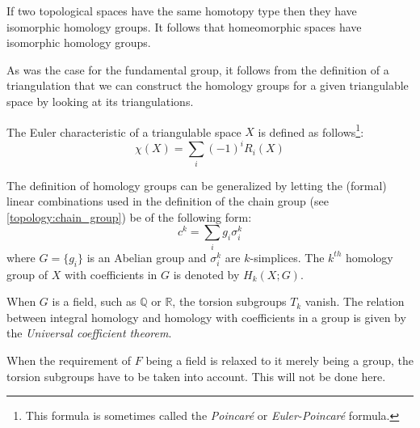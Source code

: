 	\begin{property}
		If two topological spaces have the same homotopy type then they have isomorphic homology groups. It follows that homeomorphic spaces have isomorphic homology groups.
	\end{property}
	\begin{result}
		As was the case for the fundamental group, it follows from the definition of a triangulation that we can construct the homology groups for a given triangulable space by looking at its triangulations.
	\end{result}
	
	\begin{formula}
		The Euler characteristic of a triangulable space $X$ is defined as follows\footnote{This formula is sometimes called the \textit{Poincar\'e} or \textit{Euler-Poincar\'e} formula.}:
		\begin{equation}
			\boxed{\chi(X) = \sum_i(-1)^iR_i(X)}
		\end{equation}
	\end{formula}
	
	\begin{construct}
		The definition of homology groups can be generalized by letting the (formal) linear combinations used in the definition of the chain group (see \ref{topology:chain_group}) be of the following form:
		\begin{equation}
			c^k = \sum_ig_i\sigma_i^k
		\end{equation}
		where $G = \{g_i\}$ is an Abelian group and $\sigma_i^k$ are $k$-simplices. The $k^{th}$ homology group of $X$ with coefficients in $G$ is denoted by $H_k(X; G)$.
	\end{construct}
	\begin{property}
		When $G$ is a field, such as $\mathbb{Q}$ or $\mathbb{R}$, the torsion subgroups $T_k$ vanish. The relation between integral homology and homology with coefficients in a group is given by the \textit{Universal coefficient theorem}.
	\end{property}
	
	\begin{remark*}
		When the requirement of $F$ being a field is relaxed to it merely being a group, the torsion subgroups have to be taken into account. This will not be done here.
	\end{remark*}
	
